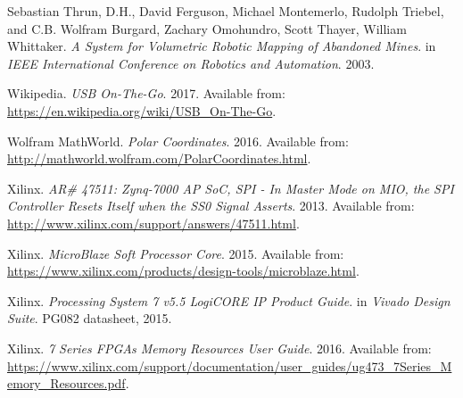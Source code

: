 \begin{thebibliography}{9}
Sebastian Thrun, D.H., David Ferguson, Michael Montemerlo, Rudolph Triebel, and C.B. Wolfram Burgard, Zachary Omohundro, Scott Thayer, William Whittaker.
\textit{A System for Volumetric Robotic Mapping of Abandoned Mines}. 
in \textit{IEEE International Conference on Robotics and Automation}. 2003.

Wikipedia. \textit{USB On-The-Go}. 2017. Available from: \url{https://en.wikipedia.org/wiki/USB_On-The-Go}.

Wolfram MathWorld. \textit{Polar Coordinates}. 2016. Available from: \url{http://mathworld.wolfram.com/PolarCoordinates.html}.

Xilinx. \textit{AR\# 47511: Zynq-7000 AP SoC, SPI - In Master Mode on MIO, the SPI Controller Resets Itself when the SS0 Signal Asserts}. 2013. Available from: \url{http://www.xilinx.com/support/answers/47511.html}.

Xilinx. \textit{MicroBlaze Soft Processor Core}. 2015. Available from: \url{https://www.xilinx.com/products/design-tools/microblaze.html}.

Xilinx. \textit{Processing System 7 v5.5 LogiCORE IP Product Guide}. in \textit{Vivado Design Suite}. PG082 datasheet, 2015.

Xilinx. \textit{7 Series FPGAs Memory Resources User Guide}. 2016. Available from: \url{https://www.xilinx.com/support/documentation/user_guides/ug473_7Series_Memory_Resources.pdf}.

\end{thebibliography}




